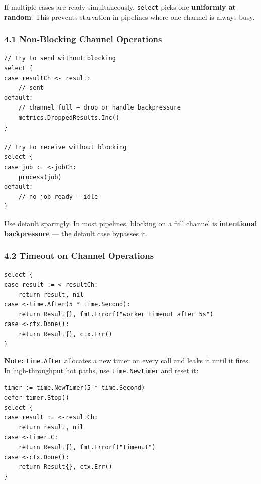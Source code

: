 \documentclass[11pt,a4paper,oneside]{book}
\begin{document}
If multiple cases are ready simultaneously, \texttt{select} picks one
\textbf{uniformly at random}. This prevents starvation in pipelines
where one channel is always busy.

\subsubsection{4.1 Non-Blocking Channel
Operations}

\begin{verbatim}
// Try to send without blocking
select {
case resultCh <- result:
    // sent
default:
    // channel full — drop or handle backpressure
    metrics.DroppedResults.Inc()
}

// Try to receive without blocking
select {
case job := <-jobCh:
    process(job)
default:
    // no job ready — idle
}
\end{verbatim}

Use default sparingly. In most pipelines, blocking on a full channel is
\textbf{intentional backpressure} --- the default case bypasses it.

\subsubsection{4.2 Timeout on Channel
Operations}

\begin{verbatim}
select {
case result := <-resultCh:
    return result, nil
case <-time.After(5 * time.Second):
    return Result{}, fmt.Errorf("worker timeout after 5s")
case <-ctx.Done():
    return Result{}, ctx.Err()
}
\end{verbatim}

\textbf{Note:} \texttt{time.After} allocates a new timer on every call
and leaks it until it fires. In high-throughput hot paths, use
\texttt{time.NewTimer} and reset it:

\begin{verbatim}
timer := time.NewTimer(5 * time.Second)
defer timer.Stop()
select {
case result := <-resultCh:
    return result, nil
case <-timer.C:
    return Result{}, fmt.Errorf("timeout")
case <-ctx.Done():
    return Result{}, ctx.Err()
}
\end{verbatim}
\end{document}
